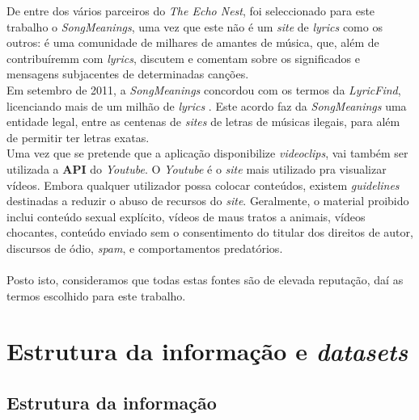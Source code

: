 \documentclass[twocolumn,twoside,11pt,a4paper]{article}
\begin{document}
De entre dos vários parceiros \cite{partners} do \textit{The Echo Nest}, foi seleccionado para este
trabalho o \textit{SongMeanings}, uma vez que este não é um \textit{site} de
\textit{lyrics} como os outros: é uma comunidade de milhares de amantes de música, que,
além de contribuíremm com \textit{lyrics}, discutem e comentam sobre os significados e
mensagens subjacentes de determinadas canções. \\
Em setembro de 2011, a \textit{SongMeanings} concordou com os termos da
\textit{LyricFind}, licenciando mais de um milhão de \textit{lyrics} \cite{songm}. Este acordo faz da
\textit{SongMeanings} uma entidade legal, entre as centenas de \textit{sites} de letras de
músicas ilegais, para além de permitir ter letras exatas. \\
\null
Uma vez que se pretende que a aplicação disponibilize \textit{videoclips}, vai também ser
utilizada a \textbf{API} do \textit{Youtube}. O \textit{Youtube} é o \textit{site} mais
utilizado pra visualizar vídeos. Embora qualquer utilizador possa colocar conteúdos,
existem \textit{guidelines} \cite{youtube} destinadas a reduzir o abuso de recursos do \textit{site}. Geralmente,
o material proibido inclui conteúdo sexual explícito, vídeos de maus tratos a animais,
vídeos chocantes, conteúdo enviado sem o consentimento do titular dos direitos de
autor, discursos de ódio, \textit{spam}, e comportamentos predatórios. \\
\\
Posto isto, consideramos que todas estas fontes são de elevada reputação, daí as
termos escolhido para este trabalho. \\


\section{Estrutura da informação e \textit{datasets}}\label{sec:info_structure}

\subsection{Estrutura da informação}
\end{document}
